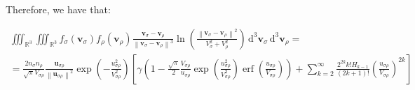 Therefore, we have that:

\begin{gather*}
    \iiint_{\mathbb{R}^3}\iiint_{\mathbb{R}^3}f_\sigma(\mathbf{v}_\sigma)f_\rho(\mathbf{v}_\rho)\frac{\mathbf{v}_\sigma-\mathbf{v}_\rho}{\left\|\mathbf{v}_\sigma-\mathbf{v}_\rho\right\|^3}\ln{\left(\frac{\left\|\mathbf{v}_\sigma-\mathbf{v}_\rho\right\|^2}{V_{\sigma}^2+V_\rho^2}\right)}\,\mathrm{d^3}\mathbf{v}_\sigma\,\mathrm{d^3}\mathbf{v}_\rho=\\
    =\frac{2n_\sigma n_\rho}{\sqrt{\pi}V_{\sigma\rho}}\frac{\mathbf{u}_{\sigma\rho}}{\left\|\mathbf{u}_{\sigma\rho}\right\|^2}\exp{\left(-\frac{u_{\sigma\rho}^2}{V_{\sigma\rho}^2}\right)}\left[\gamma \left(1-\frac{\sqrt{\pi}}{2}\frac{V_{\sigma\rho}}{u_{\sigma\rho}}\exp{\left(\frac{u_{\sigma\rho}^2}{V_{\sigma\rho}^2}\right)}\operatorname{erf}{\left(\frac{u_{\sigma\rho}}{V_{\sigma\rho}}\right)}\right)+\sum_{k=2}^\infty \frac{2^{2k}k!H_{k-1}}{(2k+1)!}\left(\frac{u_{\sigma\rho}}{V_{\sigma\rho}}\right)^{2k}\right]
\end{gather*}


